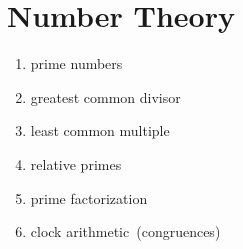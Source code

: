 
\chapter{Number Theory}

\begin{enumerate}
\item prime numbers

\item greatest common divisor

\item least common multiple

\item relative primes

\item prime factorization

\item clock arithmetic~(congruences)
\end{enumerate}
